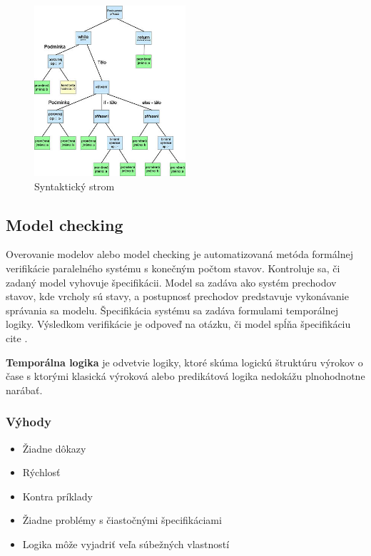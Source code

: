 \begin{figure}[ht]
\centerline{\includegraphics[width=0.5\textwidth]{images/syntakticky_strom}}
\caption[Syntaktický strom]{Syntaktický strom}
\label{obr:tree}
\end{figure}

\subsection{Model checking}
Overovanie modelov alebo model checking je automatizovaná metóda formálnej verifikácie 
paralelného systému s konečným počtom stavov. Kontroluje sa, či zadaný model vyhovuje špecifikácii. 
Model sa zadáva ako systém prechodov stavov, kde vrcholy sú stavy, a postupnosť prechodov predstavuje
vykonávanie správania sa modelu. Špecifikácia systému sa zadáva formulami temporálnej logiky. 
Výsledkom verifikácie je odpoveď na otázku, či model spĺňa špecifikáciu cite \cite{br4}.

\textbf{Temporálna logika}  je odvetvie logiky, ktoré skúma logickú štruktúru výrokov 
o čase s ktorými klasická výroková alebo predikátová logika nedokážu plnohodnotne narábať.

\subsubsection{Výhody}

\begin{itemize}
	\item Žiadne dôkazy
	\item Rýchlosť
	\item Kontra príklady
	\item Žiadne problémy s čiastočnými špecifikáciami
	\item Logika môže vyjadriť veľa súbežných vlastností
\end{itemize}

